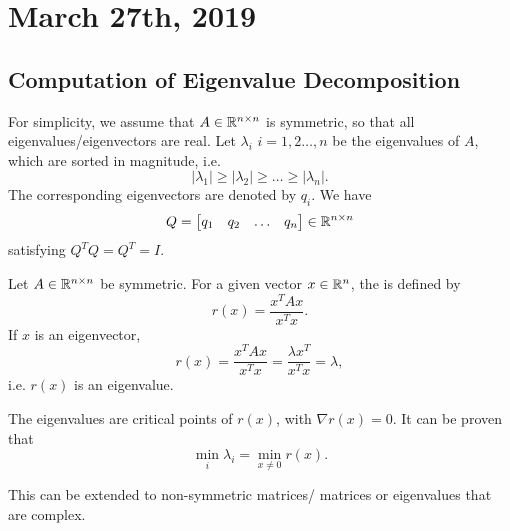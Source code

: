 \documentclass[../main/main.tex]{subfiles}
\begin{document}
\section{March 27th, 2019}
\subsection{Computation of Eigenvalue Decomposition}
For simplicity, we assume that $A\in \mathbb{R}^{n\times n}$ is symmetric, so that all eigenvalues/eigenvectors are real. Let $\lambda_i$ $i=1,2\ldots,n$ be the eigenvalues of $A$, which are sorted in magnitude, i.e.  \[
|\lambda_1|\ge |\lambda_2|\ge \ldots\ge |\lambda_n|
.\] 
The corresponding eigenvectors are denoted by $q_i$. We have  \[
	Q=\begin{bmatrix} q_1 & q_2 &\ldots& q_{n}  \end{bmatrix} \in \mathbb{R}^{n\times n}
\] satisfying $Q^{T}Q=Q^{T}=I$.
\begin{definition}
	Let $A\in \mathbb{R}^{n\times n}$ be symmetric. For a given vector $x\in \mathbb{R}^{n}$, the  is defined by  \[
		r(x)=\frac{x^{T}Ax}{x^{T}x}
	.\] If $x$ is an eigenvector, \[
	r(x)=\frac{x^{T}Ax}{x^{T}x}= \frac{\lambda x^{T}}{x^{T}x}=\lambda
,\] i.e. $r(x)$ is an eigenvalue.
\end{definition}
The eigenvalues are critical points of $r(x)$, with $\nabla r(x)=0$. It can be proven that  \[
	\min_i \lambda_i=\min_{x\neq 0} r(x)
.\]
\begin{remark}
	This can be extended to non-symmetric matrices/ matrices or eigenvalues that are complex.
\end{remark}
\end{document}
